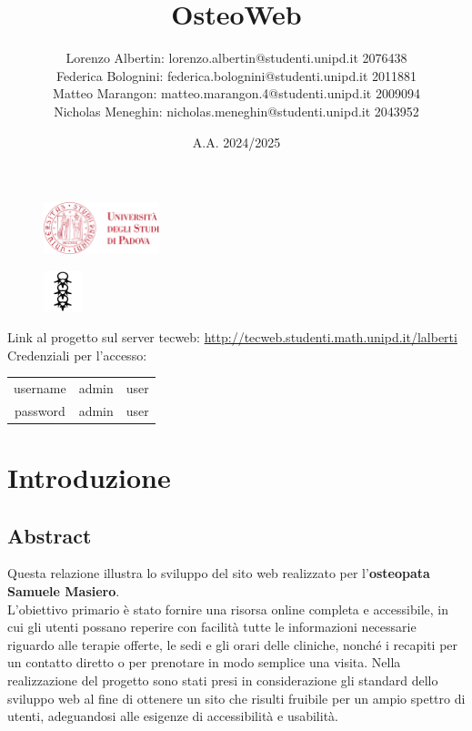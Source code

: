 \documentclass{article}
\title{OsteoWeb}
\author{Lorenzo Albertin: lorenzo.albertin@studenti.unipd.it 2076438
        \\Federica Bolognini: federica.bolognini@studenti.unipd.it 2011881
        \\Matteo Marangon: matteo.marangon.4@studenti.unipd.it 2009094
        \\Nicholas Meneghin: nicholas.meneghin@studenti.unipd.it 2043952}
\date{A.A. 2024/2025}
\begin{document}
\begin{figure}
    \centering
    \includegraphics[width=0.3\textwidth]{immagini/unipdlogo.png}
\end{figure}
\maketitle
\begin{figure} [h]
    \centering
    \includegraphics[width=0.1\textwidth]{immagini/sm_logotipo.png}
\end{figure}
\begin{center}
    Link al progetto sul server tecweb:
    \href{http://tecweb.studenti.math.unipd.it/lalberti}{http://tecweb.studenti.math.unipd.it/lalberti}\newline\newline\newline %
    Credenziali per l'accesso: \newline\newline
    \begin{tabular}{c | c | c}
    username & admin & user \\ 
    password & admin & user
    \end{tabular}
\end{center}
\newpage

\tableofcontents
\newpage

\section{Introduzione}
\subsection{Abstract}
Questa relazione illustra lo sviluppo del sito web realizzato per l'\textbf{osteopata Samuele Masiero}.
\\L'obiettivo primario è stato fornire una risorsa online completa e accessibile, in cui gli utenti possano reperire con facilità tutte le informazioni necessarie riguardo alle terapie offerte, le sedi e gli orari delle cliniche, nonché i recapiti per un contatto diretto o per prenotare in modo semplice una visita. Nella realizzazione del progetto sono stati presi in considerazione gli standard dello sviluppo web al fine di ottenere un sito che risulti fruibile per un ampio spettro di utenti, adeguandosi alle esigenze di accessibilità e usabilità.
\end{document}
